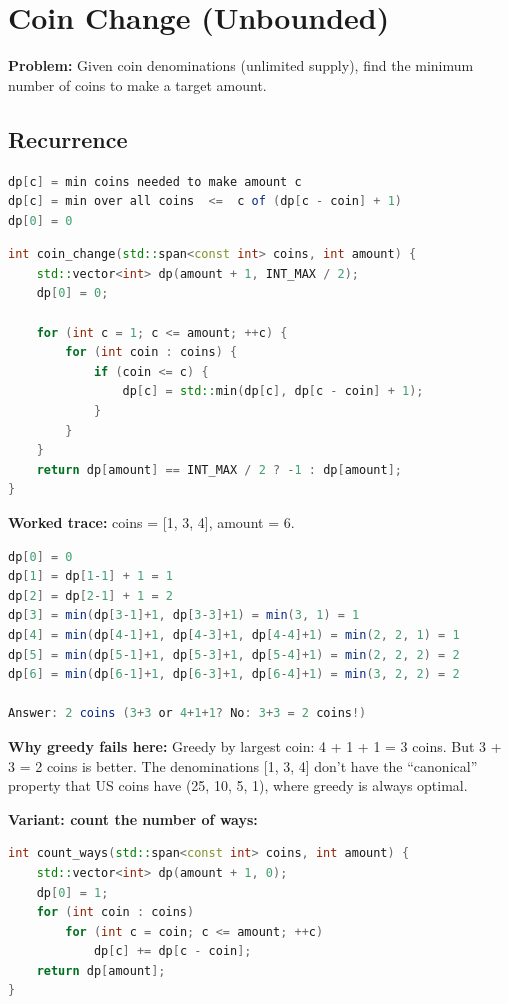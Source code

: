 \section{Coin Change (Unbounded)}

\textbf{Problem:} Given coin denominations (unlimited supply), find the minimum number of coins to make a target amount.

\subsection{Recurrence}

\begin{lstlisting}[language=Java]
dp[c] = min coins needed to make amount c
dp[c] = min over all coins  <=  c of (dp[c - coin] + 1)
dp[0] = 0
\end{lstlisting}

\begin{lstlisting}[language=C++]
int coin_change(std::span<const int> coins, int amount) {
    std::vector<int> dp(amount + 1, INT_MAX / 2);
    dp[0] = 0;

    for (int c = 1; c <= amount; ++c) {
        for (int coin : coins) {
            if (coin <= c) {
                dp[c] = std::min(dp[c], dp[c - coin] + 1);
            }
        }
    }
    return dp[amount] == INT_MAX / 2 ? -1 : dp[amount];
}
\end{lstlisting}

\textbf{Worked trace:} coins = [1, 3, 4], amount = 6.

\begin{lstlisting}[language=Java]
dp[0] = 0
dp[1] = dp[1-1] + 1 = 1
dp[2] = dp[2-1] + 1 = 2
dp[3] = min(dp[3-1]+1, dp[3-3]+1) = min(3, 1) = 1
dp[4] = min(dp[4-1]+1, dp[4-3]+1, dp[4-4]+1) = min(2, 2, 1) = 1
dp[5] = min(dp[5-1]+1, dp[5-3]+1, dp[5-4]+1) = min(2, 2, 2) = 2
dp[6] = min(dp[6-1]+1, dp[6-3]+1, dp[6-4]+1) = min(3, 2, 2) = 2

Answer: 2 coins (3+3 or 4+1+1? No: 3+3 = 2 coins!)
\end{lstlisting}

\textbf{Why greedy fails here:} Greedy by largest coin: 4 + 1 + 1 = 3 coins. But 3 + 3 = 2 coins is better. The denominations [1, 3, 4] don't have the ``canonical'' property that US coins have (25, 10, 5, 1), where greedy is always optimal.

\textbf{Variant: count the number of ways:}

\begin{lstlisting}[language=C++]
int count_ways(std::span<const int> coins, int amount) {
    std::vector<int> dp(amount + 1, 0);
    dp[0] = 1;
    for (int coin : coins)
        for (int c = coin; c <= amount; ++c)
            dp[c] += dp[c - coin];
    return dp[amount];
}
\end{lstlisting}

